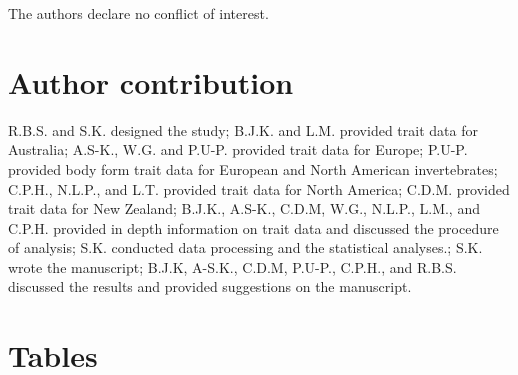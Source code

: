 \documentclass[12pt]{article}
\begin{document}
The authors declare no conflict of interest.

\section*{Author contribution}
R.B.S. and S.K. designed the study; B.J.K. and L.M. provided trait data for Australia; A.S-K., W.G. and P.U-P. provided trait data for Europe; P.U-P. provided body form trait data for European and North American invertebrates; C.P.H., N.L.P., and L.T. provided trait data for North America; C.D.M. provided trait data for New Zealand; B.J.K., A.S-K., C.D.M, W.G., N.L.P., L.M., and C.P.H. provided in depth information on trait data and discussed the procedure of analysis; S.K. conducted data processing and the statistical analyses.; S.K. wrote the manuscript; B.J.K, A-S.K., C.D.M, P.U-P., C.P.H., and R.B.S. discussed the results and provided suggestions on the manuscript.

\newpage

\printbibliography

\newpage


\section*{Tables}
\end{document}

